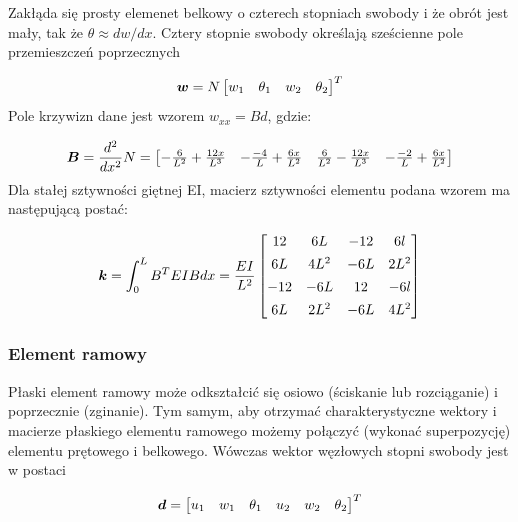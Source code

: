 Zakłąda się prosty elemenet belkowy o czterech stopniach swobody i że obrót \theta jest mały, tak że
$\theta\approx dw/dx$. Cztery stopnie swobody określają sześcienne pole przemieszczeń poprzecznych

\begin{equation}
\label{eq:ddaaaasadadddd}
\boldsymbol{w} =
    N\begin{bmatrix}
        w_1 & \theta_1 & w_2 & \theta_2
    \end{bmatrix}^T
\end{equation}
Pole krzywizn dane jest wzorem $w_{xx}=Bd$, gdzie:

\begin{equation}
\label{eq:ddaaaasadad}
\boldsymbol{B} =
    \frac{d^2}{dx^2}N=
    \begin{bmatrix}
        -\frac{6}{L^2}+\frac{12x}{L^3} & -\frac{-4}{L}+\frac{6x}{L^2} & \frac{6}{L^2}-\frac{12x}{L^3} & -\frac{-2}{L}+\frac{6x}{L^2}
    \end{bmatrix}
\end{equation}
Dla stałej sztywności giętnej EI, macierz sztywności elementu podana wzorem  ma następującą postać:

\begin{equation}
\label{eq:ddaaaasadadz}
\boldsymbol{k} =
    \int^L_0 B^T EIBdx=
    \frac{EI}{L^2}
    \begin{bmatrix}
        12 & 6L & -12 & 6l \\[1ex]
        6L & 4L^2 & -6L & 2L^2 \\[1ex]
        -12 & -6L & 12 & -6l \\[1ex]
        6L & 2L^2 & -6L & 4L^2 \\
    \end{bmatrix}
\end{equation}

\subsubsection{Element ramowy}

Płaski element ramowy może odkształcić się osiowo (ściskanie lub rozciąganie) i poprzecznie (zginanie).
Tym samym, aby otrzymać charakterystyczne wektory i macierze płaskiego elementu ramowego możemy połączyć (wykonać superpozycję) elementu prętowego i belkowego.
Wówczas wektor węzłowych stopni swobody jest w postaci

\begin{equation}
\label{eq:ddddd}
\boldsymbol{d} =
    \begin{bmatrix}
        u_1 & w_1 & \theta_1 & u_2 & w_2 & \theta_2
    \end{bmatrix}^T
\end{equation}

